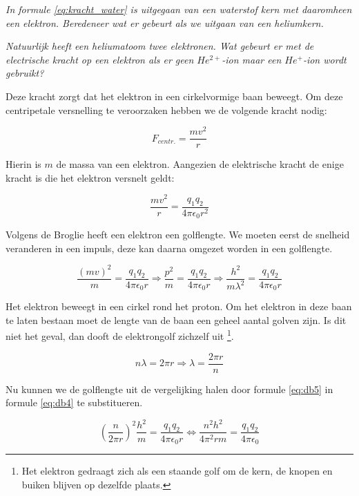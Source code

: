 \emph{In formule \ref{eq:kracht_water} is uitgegaan van een waterstof
kern met daaromheen een elektron. Beredeneer wat er gebeurt als we
uitgaan van een heliumkern. }

\emph{Natuurlijk heeft een heliumatoom twee elektronen. Wat gebeurt
er met de electrische kracht op een elektron als er geen $He^{2+}$-ion
maar een $He^{+}$-ion wordt gebruikt? }

Deze kracht zorgt dat het elektron in een cirkelvormige baan beweegt.
Om deze centripetale versnelling te veroorzaken hebben we de volgende
kracht nodig:

\begin{equation}
F_{centr.}=\frac{mv^{2}}{r}
\end{equation}


Hierin is $m$ de massa van een elektron. Aangezien de elektrische
kracht de enige kracht is die het elektron versnelt geldt:

\begin{equation}
\frac{mv^{2}}{r}=\frac{q_{1}q_{2}}{4\pi\epsilon_{0}r^{2}}
\end{equation}


Volgens de Broglie heeft een elektron een golflengte. We moeten eerst
de snelheid veranderen in een impuls, deze kan daarna omgezet worden
in een golflengte.

\begin{equation} \label{eq:db4}
\frac{\left(mv\right)^{2}}{m}=\frac{q_{1}q_{2}}{4\pi\epsilon_{0}r}
\Rightarrow\frac{p^{2}}{m}=\frac{q_{1}q_{2}}{4\pi\epsilon_{0}r}
\Rightarrow\frac{h^{2}}{m\lambda^{2}}=\frac{q_{1}q_{2}}{4\pi\epsilon_{0}r}
\end{equation}


Het elektron beweegt in een cirkel rond het proton. Om het elektron in
deze baan te laten bestaan moet de lengte van de baan een geheel aantal
golven zijn. Is dit niet het geval, dan dooft de elektrongolf zichzelf
uit \footnote{Het elektron gedraagt zich als een staande golf om de
kern, de knopen en buiken blijven op dezelfde plaats.}.

\begin{equation} \label{eq:db5}
n\lambda=2\pi r\Rightarrow\lambda=\frac{2\pi r}{n}
\end{equation}


Nu kunnen we de golflengte uit de vergelijking halen door formule
\ref{eq:db5} in formule \ref{eq:db4} te substitueren.

\begin{equation}
\left(\frac{n}{2\pi r}\right)^{2}\frac{h^{2}}{m}=\frac{q_{1}q_{2}}{4\pi\epsilon_{0}r}
\Leftrightarrow\frac{n^{2}h^{2}}{4\pi^{2}rm}=\frac{q_{1}q_{2}}{4\pi\epsilon_{0}}
\end{equation}



